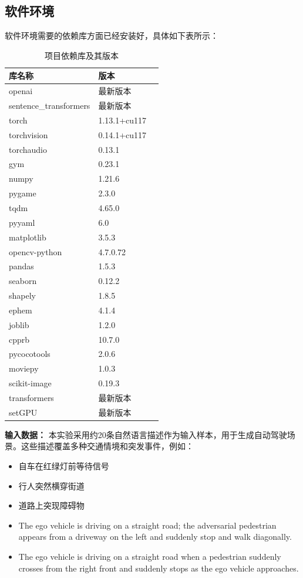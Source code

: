 \subsection*{软件环境}
软件环境需要的依赖库方面已经安装好，具体如下表所示：
	\begin{table}[H]
		\centering
			\begin{tabular}{lll}
			\hline
			\textbf{库名称} & \textbf{版本} \\
			\hline
			openai & 最新版本 \\
			sentence\_transformers & 最新版本 \\
			torch & 1.13.1+cu117 \\
			torchvision & 0.14.1+cu117 \\
			torchaudio & 0.13.1 \\
			gym & 0.23.1 \\
			numpy & 1.21.6 \\
			pygame & 2.3.0 \\
			tqdm & 4.65.0 \\
			pyyaml & 6.0 \\
			matplotlib & 3.5.3 \\
			opencv-python & 4.7.0.72 \\
			pandas & 1.5.3 \\
			seaborn & 0.12.2 \\
			shapely & 1.8.5 \\
			ephem & 4.1.4 \\
			joblib & 1.2.0 \\
			cpprb & 10.7.0 \\
			pycocotools & 2.0.6 \\
			moviepy & 1.0.3 \\
			scikit-image & 0.19.3 \\
			transformers & 最新版本 \\
			setGPU & 最新版本 \\
			\hline
		\end{tabular}
		\caption{项目依赖库及其版本}
		\label{tab:dependencies}
	\end{table}
	
\textbf{输入数据：} 本实验采用约20条自然语言描述作为输入样本，用于生成自动驾驶场景。这些描述覆盖多种交通情境和突发事件，例如：



\begin{itemize}[leftmargin=20pt]
	\item 自车在红绿灯前等待信号
	\item 行人突然横穿街道
	\item 道路上突现障碍物
	\item The ego vehicle is driving on a straight road; the adversarial pedestrian appears from a driveway on the left and suddenly stop and walk diagonally.
	\item The ego vehicle is driving on a straight road when a pedestrian suddenly crosses from the right front and suddenly stops as the ego vehicle approaches.
\end{itemize}

